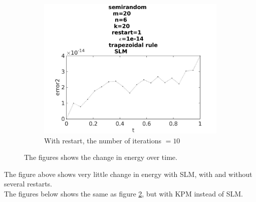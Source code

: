 \begin{figure}[H]
\begin{subfigure}[b]{0.3\textwidth}
                \includegraphics[width=\textwidth]{../MATLAB/fig/errortestrestart1.jpg}
                \caption{ With restart, the number of iterations $= 10$ }
                \label{fig:energytestrestart1}
        \end{subfigure}
        
        
        \caption{ The figures shows the change in energy over time.}
        \label{fig:energytestrestart}
\end{figure}
The figure above shows very little change in energy with SLM, with and without several restarts. \\

The figures below shows the same as figure \ref{fig:energytestrestart}, but with KPM instead of SLM. 

